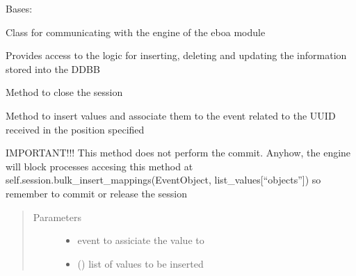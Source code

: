 \begin{fulllineitems}
\label{\detokenize{eboa.engine:eboa.engine.engine.Engine}}
Bases: 

Class for communicating with the engine of the eboa module

Provides access to the logic for inserting, deleting and updating
the information stored into the DDBB

\begin{fulllineitems}
\label{\detokenize{eboa.engine:eboa.engine.engine.Engine.close_session}}
Method to close the session

\end{fulllineitems}


\begin{fulllineitems}
\label{\detokenize{eboa.engine:eboa.engine.engine.Engine.insert_event_values}}
Method to insert values and associate them to the event related to the UUID received in the position specified

IMPORTANT!!! This method does not perform the commit. Anyhow,
the engine will block processes accesing this method at
self.session.bulk\_insert\_mappings(EventObject,
list\_values{[}“objects”{]}) so remember to commit or release the session
\begin{quote}\begin{description}
\item[{Parameters}] \leavevmode\begin{itemize}
\item {} 
 \textendash{} event to assiciate the value to

\item {} 
 () \textendash{} list of values to be inserted

\end{itemize}


\end{description}
\end{quote}
\end{fulllineitems}
\end{fulllineitems}

